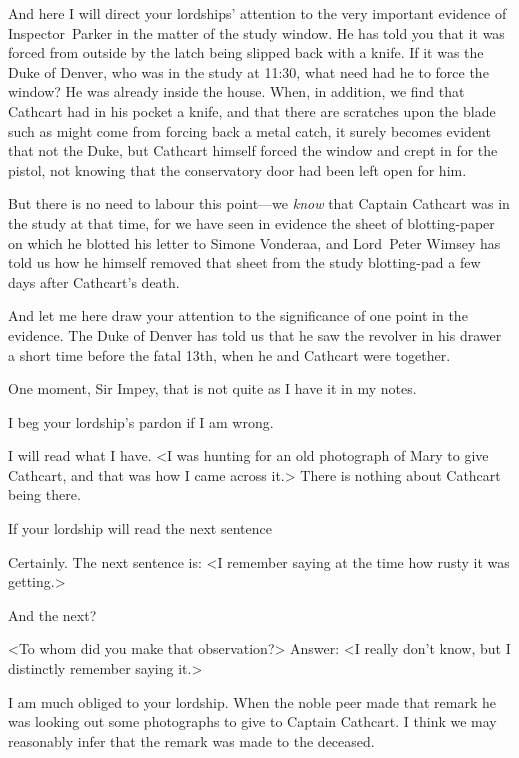 \begin{dialogue}
 

And here I will direct your lordships' attention to the very important evidence of Inspector~Parker in the matter of the study window. He has told you that it was forced from outside by the latch being slipped back with a knife. If it was the Duke of Denver, who was in the study at 11:30, what need had he to force the window? He was already inside the house. When, in addition, we find that Cathcart had in his pocket a knife, and that there are scratches upon the blade such as might come from forcing back a metal catch, it surely becomes evident that not the Duke, but Cathcart himself forced the window and crept in for the pistol, not knowing that the conservatory door had been left open for him.

 

But there is no need to labour this point—we \emph{know} that Captain Cathcart was in the study at that time, for we have seen in evidence the sheet of blotting-paper on which he blotted his letter to Simone Vonderaa, and Lord~Peter Wimsey has told us how he himself removed that sheet from the study blotting-pad a few days after Cathcart's death.

 

And let me here draw your attention to the significance of one point in the evidence. The Duke of Denver has told us that he saw the revolver in his drawer a short time before the fatal 13th, when he and Cathcart were together.



 One moment, Sir Impey, that is not quite as I have it in my notes.

 I beg your lordship's pardon if I am wrong.

 I will read what I have. <I was hunting for an old photograph of Mary to give Cathcart, and that was how I came across it.> There is nothing about Cathcart being there.

 If your lordship will read the next sentence\longdash

 Certainly. The next sentence is: <I remember saying at the time how rusty it was getting.>

 And the next?

 <To whom did you make that observation?> Answer: <I really don't know, but I distinctly remember saying it.>

 I am much obliged to your lordship. When the noble peer made that remark he was looking out some photographs to give to Captain Cathcart. I think we may reasonably infer that the remark was made to the deceased.


\end{dialogue}
